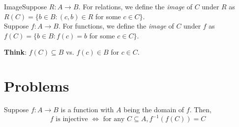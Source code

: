             \begin{definition}
                {Image}Suppose \(R\colon A \rightarrow B\). For relations, we define the \textit{image} of \(C\) under \(R\) as \(R(C) = \{b\in B\colon (c,b) \in R\) for some \(c\in C\}\). \\
                
                Suppose \(f\colon A \rightarrow B\). For functions, we define the \textit{image} of \(C\) under \(f\) as \(f(C) = \{b\in B\colon f(c) = b\) for some \(c\in C\}\). \\
            \end{definition}

            \textbf{Think}: \(f(C) \subseteq B\) vs. \(f(c) \in B\) for \(c\in C\). \\

        \section{Problems}


            \begin{exercise}
                {}Suppose \(f\colon A\rightarrow B\) is a function with \(A\) being the domain of \(f\). Then, \[f \text{ is injective } \iff \text{ for any } C\subseteq A, f^{-1}(f(C)) = C\]
            \end{exercise}

